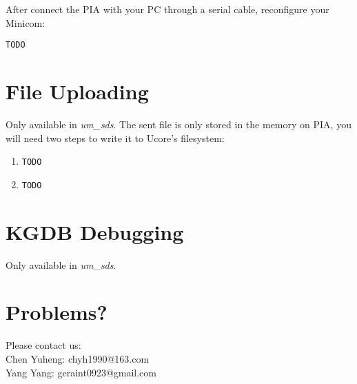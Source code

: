 \documentclass[a4paper]{article}
\begin{document}
After connect the PIA with your PC through a serial cable, 
reconfigure your Minicom:

\begin{verbatim}
TODO
\end{verbatim}

\section{File Uploading}
Only available in \emph{um\_sds}. The sent file is only stored
in the memory on PIA, you will need two steps to write it to
Ucore's filesystem:
\begin{enumerate}
\item
\begin{verbatim}
TODO
\end{verbatim}

\item
\begin{verbatim}
TODO
\end{verbatim}
\end{enumerate}

\section{KGDB Debugging}
Only available in \emph{um\_sds}. 

\section{Problems?}
Please contact us: \\
Chen Yuheng: chyh1990@163.com\\
Yang Yang: geraint0923@gmail.com
\end{document}

